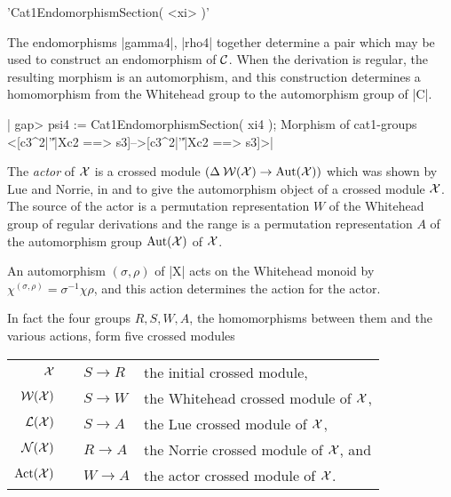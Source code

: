 %

'Cat1EndomorphismSection( <xi> )'

The endomorphisms |gamma4|, |rho4| together determine a pair which may
be  used  to  construct an  endomorphism    of ${\cal  C}$.  When  the
derivation is regular, the  resulting morphism is an automorphism, and
this  construction determines a homomorphism  from the Whitehead group
to the automorphism group of |C|.

|    gap> psi4 := Cat1EndomorphismSection( xi4 );
    Morphism of cat1-groups <[c3^2|'\|'|Xc2 ==> s3]-->[c3^2|'\|'|Xc2 ==> s3]>|

\newpage




The \emph{actor}  of ${\cal X}$ is a  crossed module $(\Delta \: {\cal
W}({\cal  X}) \to {\rm   Aut}({\cal X}))$ which  was shown  by Lue and
Norrie, in \cite{xmodN2} and \cite{xmodN1}  to give the automorphism object of
a crossed module ${\cal X}$.  The source of the actor is a permutation
representation  $W$ of the  Whitehead group of regular derivations and
the  range is a   permutation  representation $A$ of the  automorphism
group ${\rm Aut}({\cal X})$ of ${\cal X}$.

An automorphism $( \sigma, \rho )$ of |X| acts on the Whitehead monoid
by  $\chi^{(\sigma,\rho)} =  \sigma^{-1}  \chi \rho$,  and this action
determines the action for the actor.

In fact the  four groups $R, S,  W, A$, the homomorphisms between them
and the various actions, form five crossed modules\:

\begin{tabular}{rcll}
   ${\cal X}$ &\:& $S \to R$  &  the initial crossed module,                 \\
${\cal W(X)}$ &\:& $S \to W$  &  the Whitehead crossed module of ${\cal X}$, \\
${\cal L(X)}$ &\:& $S \to A$  &  the Lue crossed module of ${\cal X}$,       \\
${\cal N(X)}$ &\:& $R \to A$  &  the Norrie crossed module of ${\cal X}$, and \\
${\rm Act}({\cal X})$ &\:& $W \to A$  &  the actor crossed module of ${\cal X}$.
\end{tabular}

